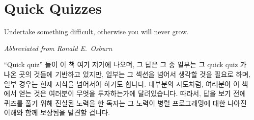 \fi

\section{Quick Quizzes}
\label{sec:howto:Quick Quizzes}
%
\epigraph{Undertake something difficult, otherwise you will never grow.}
	 {\emph{Abbreviated from Ronald E.~Osburn}}

``Quick quiz'' 들이 이 책 여기 저기에 나오며, 그 답은 
그 중 일부는 그 quick quiz 가 나온 곳의 것들에 기반하고 있지만, 일부는 그
섹션을 넘어서 생각할 것을 필요로 하며, 일부 경우는 현재 지식을 넘어서야 하기도
합니다.
대부분의 시도처럼, 여러분이 이 책에서 얻는 것은 여러분이 무엇을 투자하는가에
달려있습니다.
따라서, 답을 보기 전에 퀴즈를 풀기 위해 진실된 노력을 한 독자는 그 노력이 병렬
프로그래밍에 대한 나아진 이해와 함께 보상됨을 발견할 겁니다.

\iffalse

``Quick quizzes'' appear throughout this book, and the answers may
be found in
\IfQqzChpEnd{
the final section of each chapter.\footnote{
	In the official release/edition of this book, all the answers are
	gathered in an Appendix.
}
}{
\cref{chp:Answers to Quick Quizzes} starting on
\cpageref{chp:Answers to Quick Quizzes}.
}
Some of them are based on material in which that quick quiz
appears, but others require you to think beyond that section, and,
in some cases, beyond the realm of current knowledge.
As with most endeavors, what you get out of this book is largely
determined by what you are willing to put into it.
Therefore, readers who make a genuine effort to solve a quiz before
looking at the answer
find their effort repaid handsomely with increased understanding
of parallel programming.

\fi

